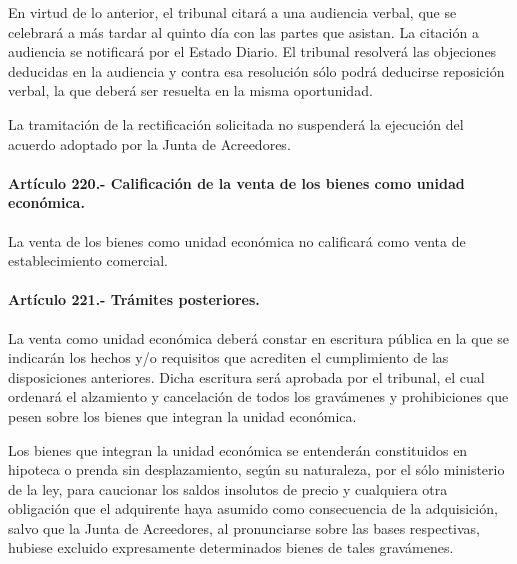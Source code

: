 \documentclass[
]{book}
\begin{document}
En virtud de lo anterior, el tribunal citará a una audiencia verbal, que se celebrará a más tardar al quinto día con las partes que asistan. La citación a audiencia se notificará por el Estado Diario. El tribunal resolverá las objeciones deducidas en la audiencia y contra esa resolución sólo podrá deducirse reposición verbal, la que deberá ser resuelta en la misma oportunidad.

La tramitación de la rectificación solicitada no suspenderá la ejecución del acuerdo adoptado por la Junta de Acreedores.

\hypertarget{artuxedculo-220.--calificaciuxf3n-de-la-venta-de-los-bienes-como-unidad-econuxf3mica.}{%
\paragraph*{Artículo 220.- Calificación de la venta de los bienes como unidad económica.}\label{artuxedculo-220.--calificaciuxf3n-de-la-venta-de-los-bienes-como-unidad-econuxf3mica.}}

La venta de los bienes como unidad económica no calificará como venta de establecimiento comercial.

\hypertarget{artuxedculo-221.--truxe1mites-posteriores.}{%
\paragraph*{Artículo 221.- Trámites posteriores.}\label{artuxedculo-221.--truxe1mites-posteriores.}}

La venta como unidad económica deberá constar en escritura pública en la que se indicarán los hechos y/o requisitos que acrediten el cumplimiento de las disposiciones anteriores. Dicha escritura será aprobada por el tribunal, el cual ordenará el alzamiento y cancelación de todos los gravámenes y prohibiciones que pesen sobre los bienes que integran la unidad económica.

Los bienes que integran la unidad económica se entenderán constituidos en hipoteca o prenda sin desplazamiento, según su naturaleza, por el sólo ministerio de la ley, para caucionar los saldos insolutos de precio y cualquiera otra obligación que el adquirente haya asumido como consecuencia de la adquisición, salvo que la Junta de Acreedores, al pronunciarse sobre las bases respectivas, hubiese excluido expresamente determinados bienes de tales gravámenes.
\end{document}
